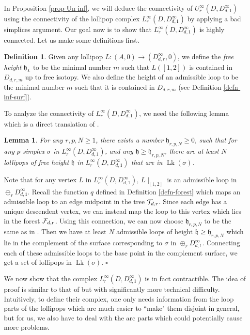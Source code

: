\documentclass[11pt, a4paper]{amsart}
\newtheorem{lem}[thm]{Lemma}
\theoremstyle{definition}
\newtheorem{defn}[thm]{Definition} %
\DeclareMathOperator{\Lk}{Lk}
\def\Proof{\noindent{\bf Proof.}\quad}
\def\qed{\hfill$\square$\smallskip}
\begin{document}
In Proposition \ref{prop-Un-inf}, we will deduce the connectivity of $U_r^\infty(D,D^{\infty}_{d,1})$ using the connectivity of the lollipop complex $L_r^\infty(D,D^{\infty}_{d,1})$ by applying a bad simplices argument. Our goal now is to show that $L_r^\infty(D,D^{\infty}_{d,1})$ is highly connected. Let us make some definitions first. 


\begin{defn}
Given any lollipop $L: (A,0) \to (D^{\infty}_{d,r},0)$,  we define the \emph{free height} $\mathfrak{h}_L$ to be the minimal  number  $m$ such that $L([1,2])$ is  contained in $D_{d,r,m}$ up to free isotopy.  We also define the height of an admissible loop to be the minimal number $m$ such that it is contained in $D_{d,r,m}$ (see Definition \ref{defn-inf-surf}).
\end{defn}







To analyze the connectivity of $L_r^{\infty}(D,D^{\infty}_{d,1})$, we need the following lemma which is a direct translation of \cite[Lemma 3.8]{SW19}.


\begin{lem}\label{lem-hight-esm}
For any $r,p,N\ge 1$, there exists a number $\mathfrak{h}_{r,p,N}\ge 0$, such that for any $p$-simplex $\sigma$ in $L_r^{\infty}(D,D^{\infty}_{d,1})$, and any $\mathfrak{h}\ge \mathfrak{h}_{r,p,N}$,
there are at least $N$ lollipops of free height $\mathfrak{h}$ in $L_r^{\infty}(D,D^{\infty}_{d,1})$ that are in $\Lk (\sigma)$. 
\end{lem}
\Proof 
Note that for any  vertex $L$ in $L_r^{\infty}(D,D^{\infty}_{d,1})$,  $L\mid_{[1,2]}$ is an admissible loop in  $\oplus_r D^{\infty}_{d,1}$.
Recall the function $q$ defined in Definition \ref{defn-forest} which maps an admissible loop to an edge midpoint in the tree ${\mathcal {T}}_{d,r}$. Since each edge has a unique descendent vertex, we can instead map the loop to this vertex which lies in the forest ${\mathcal {F}}_{d,r}$. Using this connection, we can now choose $\mathfrak{h}_{r,p,N}$ to be the same as in \cite[Lemma 3.8]{SW19}. Then we have at least $N$ admissible loops of height $\mathfrak{h}\geq \mathfrak{h}_{r,p,N}$ which lie in the complement of the surface corresponding to $\sigma$ in $\oplus_r D^{\infty}_{d,1}$. Connecting each of these admissible loops to the base point in the complement surface, we get a set of lollipops in $\Lk(\sigma)$.
\qed
 
We now show that the complex  $L_r^{\infty}(D,D^{\infty}_{d,1})$ is in fact contractible. The idea of proof is similar to that of  \cite[Proposition 3.1]{SW19} but with significantly more technical difficulty. Intuitively, to define their complex, one only needs information from the loop parts of the lollipops which  are much easier to ``make" them disjoint in general, but for us, we also have to deal with the arc parts which could potentially cause more problems.
\end{document}
